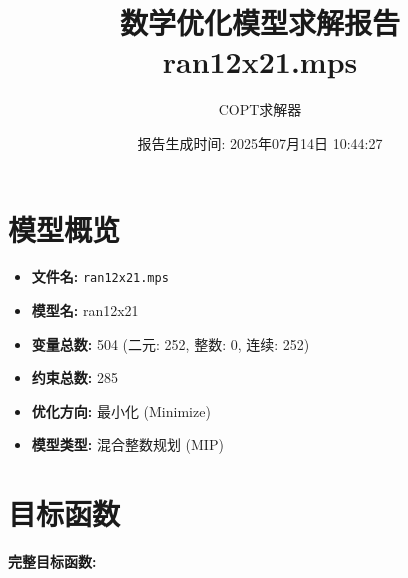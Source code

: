 \documentclass[a4paper,10pt]{article}
\title{数学优化模型求解报告\\{\large ran12x21.mps}}
\author{COPT求解器}
\date{报告生成时间: 2025年07月14日 10:44:27}
\begin{document}
\maketitle
\tableofcontents
\newpage

\section{模型概览}
\begin{itemize}
    \item \textbf{文件名:} \texttt{ran12x21.mps}
    \item \textbf{模型名:} ran12x21
    \item \textbf{变量总数:} 504 (二元: 252, 整数: 0, 连续: 252)
    \item \textbf{约束总数:} 285
    \item \textbf{优化方向:} 最小化 (Minimize)
    \item \textbf{模型类型:} 混合整数规划 (MIP)
\end{itemize}
\section{目标函数}

\textbf{完整目标函数:}
\end{document}
